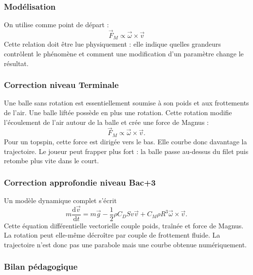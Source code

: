 \documentclass[11pt,a4paper]{article}
\begin{document}
\subsubsection*{Modélisation}

\begin{theorembox}
On utilise comme point de départ :
\[
\vec F_M\propto \vec\omega\times\vec v
\]
Cette relation doit être lue physiquement : elle indique quelles grandeurs contrôlent le phénomène et comment une modification d'un paramètre change le résultat.
\end{theorembox}

\subsubsection*{Correction niveau Terminale}

\begin{corrigebox}

Une balle sans rotation est essentiellement soumise à son poids et aux frottements de l'air. Une balle liftée possède en plus une rotation. Cette rotation modifie l'écoulement de l'air autour de la balle et crée une force de Magnus :
\[
\vec F_M\propto \vec\omega\times\vec v.
\]
Pour un topspin, cette force est dirigée vers le bas. Elle courbe donc davantage la trajectoire. Le joueur peut frapper plus fort : la balle passe au-dessus du filet puis retombe plus vite dans le court.

\end{corrigebox}

\subsubsection*{Correction approfondie niveau Bac+3}

\begin{approfondissementbox}

Un modèle dynamique complet s'écrit
\[
m\frac{\mathrm d\vec v}{\mathrm dt}
=
m\vec g
-\frac12\rho C_DSv\vec v
+
C_M\rho R^3\vec\omega\times\vec v.
\]
Cette équation différentielle vectorielle couple poids, traînée et force de Magnus. La rotation peut elle-même décroître par couple de frottement fluide. La trajectoire n'est donc pas une parabole mais une courbe obtenue numériquement.

\end{approfondissementbox}

\subsubsection*{Bilan pédagogique}
\end{document}
